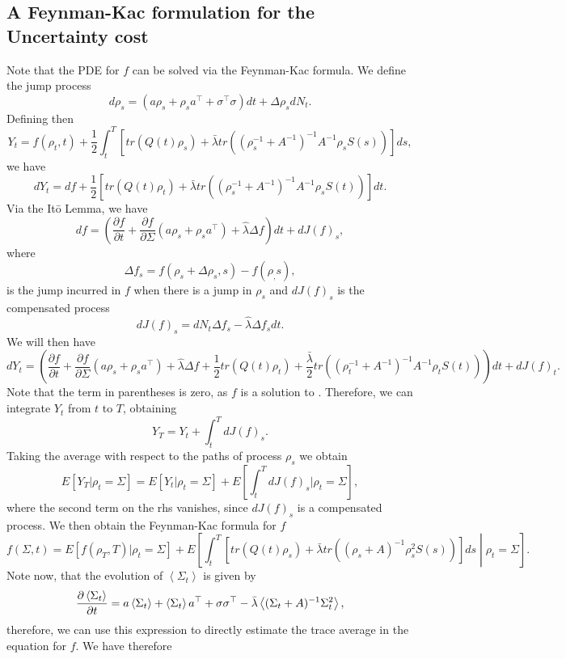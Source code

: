 \subsection{A Feynman-Kac formulation for the Uncertainty cost}

Note that the PDE for $f$ can be solved via the Feynman-Kac formula. We define the jump process
\[
d\rho_s = (a\rho_s + \rho_s a^\top  + \sigma^\top \sigma) dt + \Delta \rho_s dN_t.
\]
Defining then
\[
Y_t = f(\rho_t,t) + \frac{1}{2} \int_t^T \left[tr\left(Q(t)\rho_s\right)+ \bar{\lambda} tr \left((\rho_s^{-1}+A^{-1})^{-1}A^{-1}\rho_s S(s)\right)\right]ds,
\]
we have
\[
dY_t = df + \frac{1}{2}\left[tr\left(Q(t)\rho_t\right)+ \bar{\lambda} tr \left((\rho_s^{-1}+A^{-1})^{-1}A^{-1}\rho_s S(t)\right)\right]dt.
\]
Via the It\=o Lemma, we have
\[
df =\left(\frac{\partial f}{\partial t} + \frac{\partial f}{\partial \Sigma} (a \rho_s + \rho_s a^\top) + \hat{\lambda} \Delta f \right) dt+ d J(f)_s,
\]
where 
\[
\Delta f_s = f(\rho_s + \Delta \rho_s,s) - f(\rho_,s),
\]
is the jump incurred in $f$ when there is a jump in $\rho_s$ and $dJ(f)_s$ is the compensated process
\[
dJ(f)_s = dN_t \Delta f_s - \hat{\lambda} \Delta f_s dt.
\]
We will then have
\[
dY_t = \left(\frac{\partial f}{\partial t} + \frac{\partial f}{\partial \Sigma} (a \rho_s + \rho_s a^\top) + \hat{\lambda} \Delta f + \frac{1}{2}tr\left(Q(t)\rho_t\right)+ \frac{\bar{\lambda}}{2} tr \left((\rho_t^{-1}+A^{-1})^{-1}A^{-1}\rho_t S(t)\right)\right)dt + dJ(f)_t.
\]
Note that the term in parentheses is zero, as $f$ is a solution to . Therefore, we can integrate $Y_t$ from $t$ to $T$, obtaining
\[
Y_T = Y_t + \int_t^T dJ(f)_s.
\]
Taking the average with respect to the paths of process $\rho_s$ we obtain
\[
E\left[Y_T|\rho_t=\Sigma\right]=E\left[Y_t|\rho_t=\Sigma\right] + E\left[\int_t^T dJ(f)_s|\rho_t=\Sigma\right],
\]
where the second term on the rhs vanishes, since $dJ(f)_s$ is a compensated process. We then obtain the Feynman-Kac formula for $f$
\begin{equation}
f(\Sigma,t) =E[f(\rho_T,T)|\rho_t=\Sigma] + E\left[\int_t^T\left[tr\left(Q(t)\rho_s\right)+ \bar{\lambda} tr \left((\rho_s+A)^{-1}\rho_s^2 S(s) \right)\right]ds \middle| \rho_t=\Sigma\right].
\end{equation}
Note now, that the evolution of $\left<\Sigma_t\right>$ is given by
\[
\frac{\partial \left<\Sigma_t\right>}{\partial t} = a \left<\Sigma_t\right> + \left<\Sigma_t\right> a^\top + \sigma\sigma^\top- \bar{\lambda}\left< (\Sigma_t + A)^{-1} \Sigma_t^2\right>,
\]
therefore, we can use this expression to directly estimate the trace average in the equation for $f$. We have therefore
